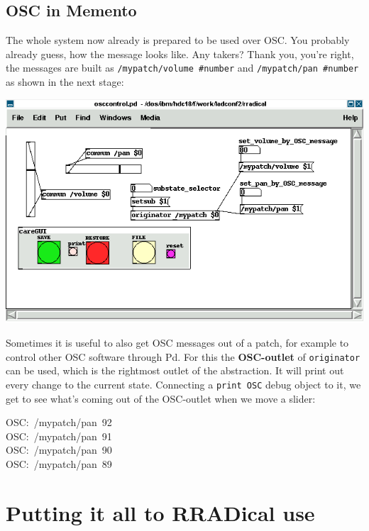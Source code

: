 \documentclass[10pt,english]{scrartcl}
\begin{document}
\subsection*{OSC in Memento}

The whole system now already is prepared to be used over OSC. You probably
already guess, how the message looks like. Any takers? Thank you, you're
right, the messages are built as \texttt{/mypatch/volume {\#}number} and
\texttt{/mypatch/pan {\#}number} as shown in the next stage:

\includegraphics{osccontrol.png}

Sometimes it is useful to also get OSC messages out of a patch, for example
to control other OSC software through Pd. For this the \textbf{OSC-outlet} of
\texttt{originator} can be used, which is the rightmost outlet of the
abstraction. It will print out every change to the current state.
Connecting a \texttt{print OSC} debug object to it, we get to see what's coming
out of the OSC-outlet when we move a slider:
\begin{ttfamily}\begin{flushleft}
\mbox{OSC:~/mypatch/pan~92}\\
\mbox{OSC:~/mypatch/pan~91}\\
\mbox{OSC:~/mypatch/pan~90}\\
\mbox{OSC:~/mypatch/pan~89}
\end{flushleft}\end{ttfamily}



\hypertarget{putting-it-all-to-rradical-use}{}
\section*{Putting it all to RRADical use}
\end{document}
